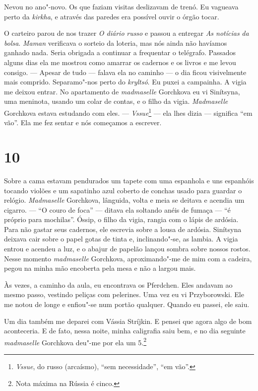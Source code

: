 Nevou no ano"-novo. Os que faziam visitas deslizavam de trenó. Eu
vagueava perto da \emph{kirkha}, e através das paredes era possível
ouvir o órgão tocar.

O carteiro parou de nos trazer \emph{O diário} \emph{russo} e passou a
entregar \emph{As notícias} \emph{da bolsa}. \emph{Maman} verificava o
sorteio da loteria, mas nós ainda não havíamos ganhado nada. Seria
obrigada a continuar a frequentar o telégrafo. Passados alguns dias ela
me mostrou como amarrar os cadernos e os livros e me levou consigo. ---
Apesar de tudo --- falava ela no caminho --- o dia ficou visivelmente
mais comprido. Separamo"-nos perto do \emph{kryltsó}. Eu puxei a
campainha. A vigia me deixou entrar. No apartamento de \emph{madmaselle}
Gorchkova eu vi Sinítsyna, uma meninota, usando um colar de contas, e o
filho da vigia. \emph{Madmaselle} Gorchkova estava estudando com eles.
--- \emph{Vssue}\footnote{\emph{Vssue}, do russo (arcaísmo), ``sem
  necessidade'', ``em vão''.} --- ela lhes dizia --- significa ``em
vão''. Ela me fez sentar e nós começamos a escrever.

\section{10}

Sobre a cama estavam pendurados um tapete com uma espanhola e uns
espanhóis tocando violões e um sapatinho azul coberto de conchas usado
para guardar o relógio. \emph{Madmaselle} Gorchkova, lânguida, volta e
meia se deitava e acendia um cigarro. --- ``O couro de foca'' --- ditava
ela soltando anéis de fumaça --- ``é próprio para mochilas''. Óssip, o
filho da vigia, rangia com o lápis de ardósia. Para não gastar seus
cadernos, ele escrevia sobre a lousa de ardósia. Sinítsyna deixava cair
sobre o papel gotas de tinta e, inclinando"-se, as lambia. A vigia entrou
e acendeu a luz, e o abajur de papelão lançou sombra sobre nossos
rostos. Nesse momento \emph{madmaselle} Gorchkova, aproximando"-me de mim %
com a cadeira, pegou na minha mão encoberta pela mesa e não a largou
mais.

Às vezes, a caminho da aula, eu encontrava os Pferdchen. Eles andavam ao
mesmo passo, vestindo peliças com pelerines. Uma vez eu vi Przyborowski.
Ele me notou de longe e enfiou"-se num portão qualquer. Quando eu passei,
ele saiu.

Um dia também me deparei com Vássia Stríjkin. E pensei que agora algo de
bom aconteceria. E de fato, nessa noite, minha caligrafia saiu bem, e no
dia seguinte \emph{madmaselle} Gorchkova deu"-me por ela um 5.\footnote{Nota
  máxima na Rússia é cinco.}

